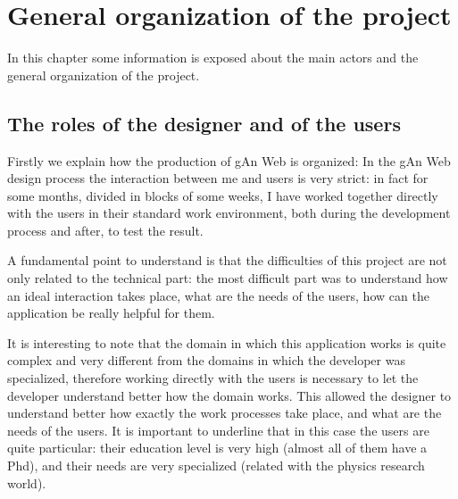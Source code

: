 
\chapter{General organization of the project} %

\label{Chapter3} %


In this chapter some information is exposed about the main actors and the general organization of the project. 

\section{The roles of the designer and of the users}
Firstly we explain how the production of gAn Web is organized:
In the gAn Web design process the interaction between me and users is very strict: in fact for some months, divided in blocks of some weeks, I have worked together directly with the users in their standard work environment, both during the development process and after, to test the result. 

A fundamental point to understand is that the difficulties of this project are not only related to the technical part: the most difficult part was to understand how an ideal interaction takes place, what are the needs of the users, how can the application be really helpful for them.
 
It is interesting to note that the domain in which this application works is quite complex and very different from the domains in which the developer was specialized, therefore working directly with the users is necessary to let the developer understand better how the domain works.
This allowed the designer to understand better how exactly the work processes take place, and what are the needs of the users. 
It is important to underline that in this case the users are quite particular: their education level is very high (almost all of them have a Phd), and their needs are very specialized (related with the physics research world).

